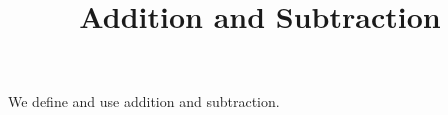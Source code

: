 \documentclass{ximera}
\title{Addition and Subtraction}
\begin{document}
\begin{abstract}
\end{abstract}
\maketitle

We define and use addition and subtraction.
\end{document}
